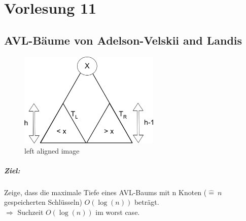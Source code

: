\chapter{Vorlesung 11}
\section{AVL-Bäume von Adelson-Velskii and Landis}

\begin{figure}
    \includegraphics[width=0.6\textwidth,left]{Grafik/img1.png}
    \caption{left aligned image}
\end{figure}


\paragraph{Ziel:}%
Zeige, dass die maximale Tiefe eines AVL-Baums mit n Knoten ($\hat{=}~ n$ gespeicherten Schlüsseln) $O(\log(n))$ beträgt.\\
$\Rightarrow$ Suchzeit $O(\log(n))$ im worst case.


